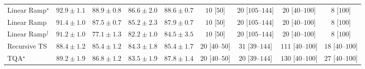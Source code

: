 \begin{tabular}{l|cccc|cccc|}
Linear Ramp$^\star$ & {\cellcolor[HTML]{00482A}} \color[HTML]{F1F1F1} $92.9\pm 1.1$ & {\cellcolor[HTML]{006335}} \color[HTML]{F1F1F1} $88.9\pm 0.8$ & {\cellcolor[HTML]{0A703A}} \color[HTML]{F1F1F1} $86.6\pm 2.0$ & {\cellcolor[HTML]{006435}} \color[HTML]{F1F1F1} $88.6\pm 0.7$ & {\cellcolor[HTML]{FFF7F3}} \color[HTML]{000000} $10$ [$50$] & {\cellcolor[HTML]{FFF4F0}} \color[HTML]{000000} $20$ [$105$--$144$] & {\cellcolor[HTML]{FFF4F0}} \color[HTML]{000000} $20$ [$40$--$100$] & {\cellcolor[HTML]{FFF7F3}} \color[HTML]{000000} $8$ [$100$] \\
Linear Ramp & {\cellcolor[HTML]{00522E}} \color[HTML]{F1F1F1} $91.4\pm 1.0$ & {\cellcolor[HTML]{036B38}} \color[HTML]{F1F1F1} $87.5\pm 0.7$ & {\cellcolor[HTML]{13773D}} \color[HTML]{F1F1F1} $85.2\pm 2.3$ & {\cellcolor[HTML]{016937}} \color[HTML]{F1F1F1} $87.9\pm 0.7$ & {\cellcolor[HTML]{FFF7F3}} \color[HTML]{000000} $10$ [$50$] & {\cellcolor[HTML]{FFF4F0}} \color[HTML]{000000} $20$ [$105$--$144$] & {\cellcolor[HTML]{FFF4F0}} \color[HTML]{000000} $20$ [$40$--$100$] & {\cellcolor[HTML]{FFF7F3}} \color[HTML]{000000} $8$ [$100$] \\
Linear Ramp$^\dagger$ & {\cellcolor[HTML]{00532F}} \color[HTML]{F1F1F1} $91.2\pm 1.0$ & {\cellcolor[HTML]{45AD5F}} \color[HTML]{F1F1F1} $77.1\pm 1.3$ & {\cellcolor[HTML]{268846}} \color[HTML]{F1F1F1} $82.2\pm 1.0$ & {\cellcolor[HTML]{177B3F}} \color[HTML]{F1F1F1} $84.5\pm 3.5$ & {\cellcolor[HTML]{FFF7F3}} \color[HTML]{000000} $10$ [$50$] & {\cellcolor[HTML]{FFF4F0}} \color[HTML]{000000} $20$ [$105$--$144$] & {\cellcolor[HTML]{FFF4F0}} \color[HTML]{000000} $20$ [$40$--$100$] & {\cellcolor[HTML]{FFF7F3}} \color[HTML]{000000} $8$ [$100$] \\
Recursive TS & {\cellcolor[HTML]{006636}} \color[HTML]{F1F1F1} $88.4\pm 1.2$ & {\cellcolor[HTML]{12763D}} \color[HTML]{F1F1F1} $85.4\pm 1.2$ & {\cellcolor[HTML]{187B3F}} \color[HTML]{F1F1F1} $84.3\pm 1.8$ & {\cellcolor[HTML]{12763D}} \color[HTML]{F1F1F1} $85.4\pm 1.7$ & {\cellcolor[HTML]{FFF4F0}} \color[HTML]{000000} $20$ [$40$--$50$] & {\cellcolor[HTML]{FFF2EE}} \color[HTML]{000000} $31$ [$39$--$144$] & {\cellcolor[HTML]{FDE0DD}} \color[HTML]{000000} $111$ [$40$--$100$] & {\cellcolor[HTML]{FFF5F1}} \color[HTML]{000000} $18$ [$40$--$100$] \\
TQA$^\star$ & {\cellcolor[HTML]{006034}} \color[HTML]{F1F1F1} $89.2\pm 1.9$ & {\cellcolor[HTML]{086E3A}} \color[HTML]{F1F1F1} $86.8\pm 1.2$ & {\cellcolor[HTML]{1E8041}} \color[HTML]{F1F1F1} $83.5\pm 1.9$ & {\cellcolor[HTML]{016937}} \color[HTML]{F1F1F1} $87.8\pm 1.4$ & {\cellcolor[HTML]{FFF4F0}} \color[HTML]{000000} $20$ [$40$--$50$] & {\cellcolor[HTML]{FFF4F0}} \color[HTML]{000000} $20$ [$39$--$144$] & {\cellcolor[HTML]{FDDBD7}} \color[HTML]{000000} $130$ [$40$--$100$] & {\cellcolor[HTML]{FFF3EF}} \color[HTML]{000000} $27$ [$40$--$100$] \\

\end{tabular}
